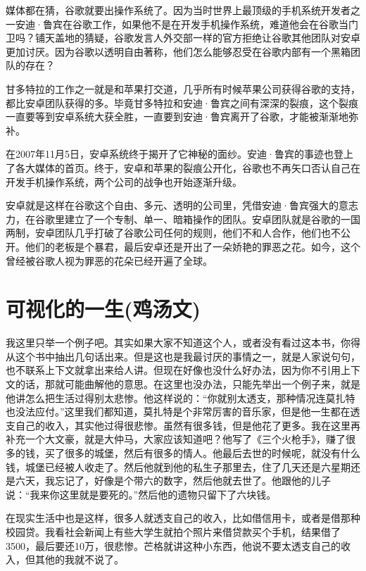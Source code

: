 \documentclass[
  letterpaper,
  DIV=11,
  numbers=noendperiod]{scrreprt}
\begin{document}
媒体都在猜，谷歌就要出操作系统了。因为当时世界上最顶级的手机系统开发者之一安迪·鲁宾在谷歌工作，如果他不是在开发手机操作系统，难道他会在谷歌当门卫吗？铺天盖地的猜疑，谷歌发言人外交部一样的官方拒绝让谷歌其他团队对安卓更加讨厌。因为谷歌以透明自由著称，他们怎么能够忍受在谷歌内部有一个黑箱团队的存在？

甘多特拉的工作之一就是和苹果打交道，几乎所有时候苹果公司获得谷歌的支持，都比安卓团队获得的多。毕竟甘多特拉和安迪·鲁宾之间有深深的裂痕，这个裂痕一直要等到安卓系统大获全胜，一直要到安迪·鲁宾离开了谷歌，才能被渐渐地弥补。

在2007年11月5日，安卓系统终于揭开了它神秘的面纱。安迪·鲁宾的事迹也登上了各大媒体的首页。终于，安卓和苹果的裂痕公开化，谷歌也不再矢口否认自己在开发手机操作系统，两个公司的战争也开始逐渐升级。

安卓就是这样在谷歌这个自由、多元、透明的公司里，凭借安迪·鲁宾强大的意志力，在谷歌里建立了一个专制、单一、暗箱操作的团队。安卓团队就是谷歌的一国两制，安卓团队几乎打破了谷歌公司任何的规则，他们不和人合作，他们也不公开。他们的老板是个暴君，最后安卓还是开出了一朵娇艳的罪恶之花。如今，这个曾经被谷歌人视为罪恶的花朵已经开遍了全球。


\chapter{可视化的一生(鸡汤文)}\label{ux53efux89c6ux5316ux7684ux4e00ux751fux9e21ux6c64ux6587}

我这里只举一个例子吧。其实如果大家不知道这个人，或者没有看过这本书，你得从这个书中抽出几句话出来。但是这也是我最讨厌的事情之一，就是人家说句句，也不联系上下文就拿出来给人讲。但现在好像也没什么好办法，因为你不引用上下文的话，那就可能曲解他的意思。在这里也没办法，只能先举出一个例子来，就是他讲怎么把生活过得别太悲惨。他这样说的：``你就别太透支，那种情况连莫扎特也没法应付。''这里我们都知道，莫扎特是个非常厉害的音乐家，但是他一生都在透支自己的收入，其实他过得很悲惨。虽然有很多钱，但是他花了更多。我在这里再补充一个大文豪，就是大仲马，大家应该知道吧？他写了《三个火枪手》，赚了很多的钱，买了很多的城堡，然后有很多的情人。他最后去世的时候呢，就没有什么钱，城堡已经被人收走了。然后他就到他的私生子那里去，住了几天还是六星期还是六天，我忘记了，好像是个带六的数字，然后他就去世了。他跟他的儿子说：``我来你这里就是要死的。''然后他的遗物只留下了六块钱。

在现实生活中也是这样，很多人就透支自己的收入，比如借信用卡，或者是借那种校园贷。我看社会新闻上有些大学生就拍个照片来借贷款买个手机，结果借了3500，最后要还10万，很悲惨。芒格就讲这种小东西，他说不要太透支自己的收入，但其他的我就不说了。
\end{document}
